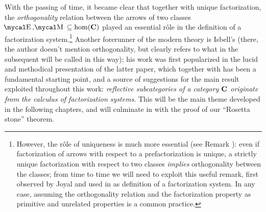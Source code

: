 With the passing of time, it became clear that together with unique factorization, the \emph{orthogonality} relation between the arrows of two classes $\EE,\MM\subseteq \hom(\CC)$ played an essential r\^ole in the definition of a factorization system.\footnote{However, the r\^ole of uniqueness is much more essential (see Remark ): even if factorization of arrows with respect to a prefactorization is unique, a strictly unique factorization with respect to two classes \emph{implies} orthogonality between the classes; from time to time we will need to exploit this useful remark, first observed by Joyal and used in \cite{Joyalcatlab} as definition of a factorization system. In any case, assuming the orthogonality relation and the factorization property as primitive and unrelated properties is a common practice.}
Another forerunner of the modern theory is Isbell's \cite{Isb} (there, the author doesn't mention orthogonality, but clearly refers to what in the subsequent \cite{FK} will be called in this way); his work was first popularized in the lucid and methodical presentation of the latter paper, which together with \cite{CHK} has been a fundamental starting point, and a source of suggestions for the main result exploited throughout this work: \emph{reflective subcategories of a category $\textbf{C}$ originate from the calculus of factorization systems}. This will be the main theme developed in the following chapters, and will culminate in \achap {} with the proof of our ``Rosetta stone'' theorem.
